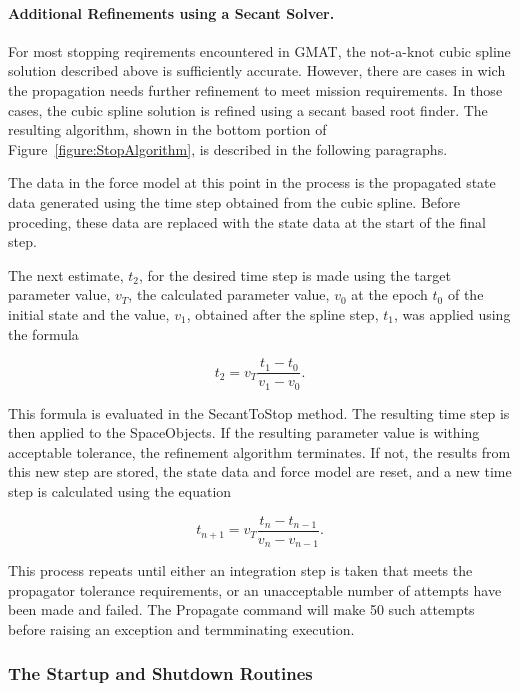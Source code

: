 \paragraph{Additional Refinements using a Secant Solver.}  For most stopping reqirements encountered
in GMAT, the not-a-knot cubic spline solution described above is sufficiently accurate.  However,
there are cases in wich the propagation needs further refinement to meet mission requirements.  In
those cases, the cubic spline solution is refined using a secant based root finder.  The resulting
algorithm, shown in the bottom portion of Figure~\ref{figure:StopAlgorithm}, is described in the
following paragraphs.

The data in the force model at this point in the process is the propagated state data generated
using the time step obtained from the cubic spline.  Before proceding, these data are replaced with
the state data at the start of the final step.

The next estimate, $t_2$, for the desired time step is made using the target parameter value,
$v_T$, the calculated parameter value, $v_0$ at the epoch $t_0$ of the initial state and the value,
$v_1$, obtained after the spline step, $t_1$, was applied using the formula

\begin{equation}
t_2 = v_T \frac{t_1-t_0}{v_1-v_0}.
\end{equation}

\noindent This formula is evaluated in the SecantToStop method.  The resulting time step is then
applied to the SpaceObjects.  If the resulting parameter value is withing acceptable tolerance, the
refinement algorithm terminates.  If not, the results from this new step are stored, the state data
and force model are reset, and a new time step is calculated using the equation

\begin{equation}
t_{n+1} = v_T \frac{t_n-t_{n-1}}{v_n-v_{n-1}}.
\end{equation}

\noindent This process repeats until either an integration step is taken that meets the propagator
tolerance requirements, or an unacceptable number of attempts have been made and failed.  The
Propagate command will make 50 such attempts before raising an exception and termminating execution.

\subsubsection{The Startup and Shutdown Routines}

